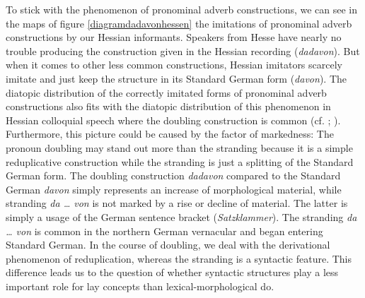 \documentclass[output=paper]{LSP/langsci}
\begin{document}
To stick with the phenomenon of pronominal adverb constructions, we can see in the maps of figure \ref{diagramdadavonhessen} the imitations of pronominal adverb constructions by our Hessian informants. Speakers from Hesse have nearly no trouble producing the construction given in the Hessian recording (\textit{dadavon}). But when it comes to other less common constructions, Hessian imitators  scarcely imitate and just keep the structure in its Standard German form (\textit{davon}). The diatopic distribution of the correctly imitated forms of pronominal adverb constructions also fits with the diatopic distribution of this phenomenon in Hessian colloquial speech where the doubling construction is common (cf. \cite{leser_zum_2012}; \cite[Round 1 Questions 11, 12; Round 2 Question 21]{ADA}). Furthermore, this picture could be caused by the factor of markedness: The pronoun doubling may stand out more than the stranding because it is a simple reduplicative construction while the stranding is just a splitting of the Standard German form. The doubling construction \textit{dadavon} compared to the Standard German \textit{davon} simply represents an increase of morphological material, while stranding \textit{da … von} is not marked by a rise or decline of material. The latter is simply a usage of the German sentence bracket (\textit{Satzklammer}).  The stranding \textit{da … von} is common in the northern German vernacular and began  entering Standard German. In the course of  doubling, we deal with the derivational phenomenon of reduplication, whereas the stranding is a syntactic feature. This difference leads us to the question of whether syntactic structures play a less important role for lay concepts than lexical-morphological do.
\end{document}
